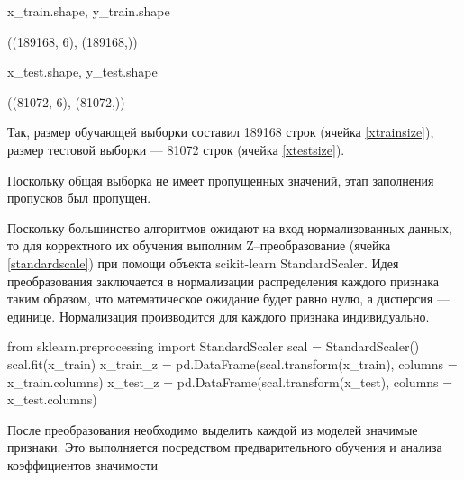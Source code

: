 \begin{pyin}[xtrainsize]
x_train.shape, y_train.shape
\end{pyin}

\begin{pyprint}
((189168, 6), (189168,))
\end{pyprint}
\begin{pyin}[xtestsize]
x_test.shape, y_test.shape
\end{pyin}

\begin{pyprint}
	((81072, 6), (81072,))
\end{pyprint}
Так, размер обучающей выборки составил 189168 строк (ячейка \ref{xtrainsize}), размер тестовой выборки --- 81072 строк (ячейка \ref{xtestsize}).

Поскольку общая выборка не имеет пропущенных значений, этап заполнения пропусков был пропущен.

Поскольку большинство алгоритмов ожидают на вход нормализованных данных, то для корректного их обучения выполним Z--преобразование (ячейка \ref{standardscale}) при помощи объекта scikit-learn StandardScaler. Идея преобразования заключается в нормализации распределения каждого признака таким образом, что математическое ожидание будет равно нулю, а дисперсия --- единице. Нормализация производится для каждого признака индивидуально.
\begin{pyin}[standardscale]
from sklearn.preprocessing import StandardScaler
scal = StandardScaler()
scal.fit(x_train)
x_train_z = pd.DataFrame(scal.transform(x_train), columns = x_train.columns)
x_test_z = pd.DataFrame(scal.transform(x_test), columns = x_test.columns)
\end{pyin}
После преобразования необходимо выделить каждой из моделей значимые признаки. Это выполняется посредством предварительного обучения и анализа коэффициентов значимости \cite{hackeling2017mastering}


